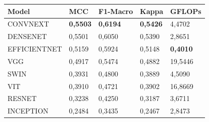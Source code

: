 \begin{tabular}{lllll}
\toprule
Model & MCC & F1-Macro & Kappa & GFLOPs \\
\midrule
CONVNEXT & \textbf{0,5503} & \textbf{0,6194} & \textbf{0,5426} & 4,4702 \\
DENSENET & 0,5501 & 0,6050 & 0,5390 & 2,8651 \\
EFFICIENTNET & 0,5159 & 0,5924 & 0,5148 & \textbf{0,4010} \\
VGG & 0,4917 & 0,5474 & 0,4882 & 19,5446 \\
SWIN & 0,3931 & 0,4800 & 0,3889 & 4,5090 \\
VIT & 0,3910 & 0,4721 & 0,3902 & 16,8669 \\
RESNET & 0,3238 & 0,4250 & 0,3187 & 3,6711 \\
INCEPTION & 0,2484 & 0,3435 & 0,2467 & 2,8473 \\
\bottomrule
\end{tabular}
